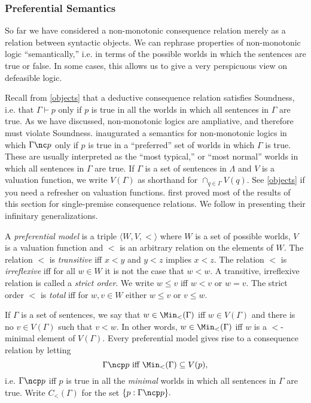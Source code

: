 \subsubsection{Preferential Semantics}
\label{KLMsemantics}
So far we have considered a non-monotonic consequence relation merely as a
relation between syntactic objects. We can rephrase properties of non-monotonic
logic ``semantically,'' i.e. in terms of the possible worlds in which the
sentences are true or false. In some cases, this allows us to give a very
perspicuous view on defeasible logic.

Recall from \autoref{objects} that a deductive consequence relation satisfies
Soundness, i.e. that $\Gamma \vdash p$ only if $p$ is true in all the worlds in
which all sentences in $\Gamma$ are true. As we have discussed, non-monotonic
logics are ampliative, and therefore must violate Soundness.
\citet{shoham1987semantical} inaugurated a semantics for non-monotonic logics in
which $\Gamma\nc p$ only if $p$ is true in a ``preferred'' set of worlds in
which $\Gamma$ is true. These are usually interpreted as the ``most typical,'' or 
``most normal'' worlds in which all sentences in $\Gamma$ are true.   If $\Gamma$
is a set of sentences in $\Lambda$ and $V$ is a valuation function, we write
$V(\Gamma)$ as shorthand for $\cap_{q\in \Gamma} V(q).$ See \autoref{objects} if
you need a refresher on valuation functions. \citet{kraus1990nonmonotonic} first
proved most of the results of this section for single-premise consequence
relations. We follow \citet{makinson1994general} in presenting their infinitary
generalizations.

A {\em preferential model} is a triple $\langle W, V, < \rangle$ where $W$ is a
set of possible worlds, $V$ is a valuation function and $<$ is an arbitrary
relation on the elements of $W$. The relation $<$ is {\em transitive} iff $x<y$
and $y<z$ implies $x<z$. The relation $<$ is {\em irreflexive} iff for all $w\in
W$ it is not the case that $w<w.$ A transitive, irreflexive relation is called a
{\em strict order}. We write $w\leq v$ iff $w<v$ or $w=v$. The strict order $<$
is {\em total} iff for $w,v\in W$ either $w\leq v$ or $v\leq w$.

If $\Gamma$ is a set of sentences, we say that $w\in \Min_<(\Gamma)$ iff $w\in
V(\Gamma)$ and there is no $v \in V(\Gamma)$ such that $v < w$. In other words,
$w\in \Min_<(\Gamma)$ iff $w$ is a $<$-minimal element of $V(\Gamma)$. Every
preferential model gives rise to a consequence relation by letting  $$\Gamma
\ncp p \text{ iff } \Min_<(\Gamma) \subseteq V(p),$$ i.e. $\Gamma \ncp p$ iff
$p$ is true in all the {\em minimal} worlds in which all sentences in $\Gamma$
are true. Write $C_<(\Gamma)$ for the set $\{ p : \Gamma \ncp p \}.$ 

